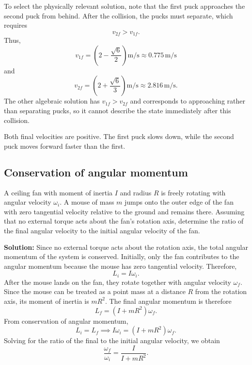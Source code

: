 \documentclass[../main.tex]{subfiles}
\begin{document}
To select the physically relevant solution, note that the first puck
approaches the second puck from behind. After the collision, the pucks
must separate, which requires
\begin{equation}
    v_{2f}>v_{1f}.
\end{equation}
Thus,
\begin{equation}
    \boxed{
    v_{1f}
    = \left(2-\frac{\sqrt{6}}{2}\right)\mathrm{m/s}
    \approx 0.775\,\mathrm{m/s}
    }
\end{equation}
and
\begin{equation}
    \boxed{
    v_{2f}
    = \left(2+\frac{\sqrt{6}}{3}\right)\mathrm{m/s}
    \approx 2.816\,\mathrm{m/s}
    }.
\end{equation}
The other algebraic solution has $v_{1f}>v_{2f}$ and corresponds to
approaching rather than separating pucks, so it cannot describe the
state immediately after this collision.

Both final velocities are positive. The first puck slows down,
while the second puck moves forward faster than the first.



\subsection{Conservation of angular momentum}

A ceiling fan with moment of inertia $I$ and radius $R$ is freely rotating with angular velocity $\omega_i$. A mouse of mass $m$ jumps onto the outer edge of the fan
with zero tangential velocity relative to the ground and remains there. Assuming that no external torque acts about the fan's rotation axis, determine the ratio of the final angular velocity to the initial angular
velocity of the fan.

\textbf{Solution:}
Since no external torque acts about the rotation axis, the total angular momentum of the system is conserved. Initially, only the fan contributes to the angular momentum because the mouse has zero tangential velocity. Therefore,
\begin{equation}
    L_i = I\omega_i.
\end{equation}
After the mouse lands on the fan, they rotate together with angular velocity $\omega_f$. Since the mouse can be treated as a point mass at a distance $R$ from the rotation axis, its moment of inertia is $mR^2$. The final angular momentum is therefore
\begin{equation}
    L_f = (I+mR^2)\omega_f.
\end{equation}
From conservation of angular momentum,
\begin{equation}
    L_i = L_f
    \implies
    I\omega_i = (I+mR^2)\omega_f.
\end{equation}
Solving for the ratio of the final to the initial angular velocity, we obtain
\begin{equation}
    \boxed{
    \frac{\omega_f}{\omega_i}
    = \frac{I}{I+mR^2}
    }.
\end{equation}
\end{document}
